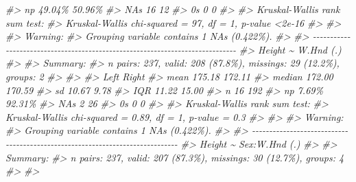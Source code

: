 \documentclass[
]{book}
\newenvironment{Shaded}{\begin{snugshade}}{\end{snugshade}}
\newcommand{\CommentTok}[1]{\textcolor[rgb]{0.56,0.35,0.01}{\textit{#1}}}
\begin{document}
\begin{Shaded}
\begin{Highlighting}[]
\CommentTok{\#\textgreater{} np      49.04\%  50.96\%}
\CommentTok{\#\textgreater{} NAs         16      12}
\CommentTok{\#\textgreater{} 0s           0       0}
\CommentTok{\#\textgreater{} }
\CommentTok{\#\textgreater{} Kruskal{-}Wallis rank sum test:}
\CommentTok{\#\textgreater{}   Kruskal{-}Wallis chi{-}squared = 97, df = 1, p{-}value \textless{}2e{-}16}
\CommentTok{\#\textgreater{} }
\CommentTok{\#\textgreater{} }
\CommentTok{\#\textgreater{} Warning:}
\CommentTok{\#\textgreater{}   Grouping variable contains 1 NAs (0.422\%).}
\CommentTok{\#\textgreater{} }
\CommentTok{\#\textgreater{} {-}{-}{-}{-}{-}{-}{-}{-}{-}{-}{-}{-}{-}{-}{-}{-}{-}{-}{-}{-}{-}{-}{-}{-}{-}{-}{-}{-}{-}{-}{-}{-}{-}{-}{-}{-}{-}{-}{-}{-}{-}{-}{-}{-}{-}{-}{-}{-}{-}{-}{-}{-}{-}{-}{-}{-}{-}{-}{-}{-}{-}{-}{-}{-}{-}{-}{-}{-}{-}{-}{-}{-}{-}{-}{-}{-}{-}{-} }
\CommentTok{\#\textgreater{} Height \textasciitilde{} W.Hnd (.)}
\CommentTok{\#\textgreater{} }
\CommentTok{\#\textgreater{} Summary: }
\CommentTok{\#\textgreater{} n pairs: 237, valid: 208 (87.8\%), missings: 29 (12.2\%), groups: 2}
\CommentTok{\#\textgreater{} }
\CommentTok{\#\textgreater{}                       }
\CommentTok{\#\textgreater{}           Left   Right}
\CommentTok{\#\textgreater{} mean    175.18  172.11}
\CommentTok{\#\textgreater{} median  172.00  170.59}
\CommentTok{\#\textgreater{} sd       10.67    9.78}
\CommentTok{\#\textgreater{} IQR      11.22   15.00}
\CommentTok{\#\textgreater{} n           16     192}
\CommentTok{\#\textgreater{} np       7.69\%  92.31\%}
\CommentTok{\#\textgreater{} NAs          2      26}
\CommentTok{\#\textgreater{} 0s           0       0}
\CommentTok{\#\textgreater{} }
\CommentTok{\#\textgreater{} Kruskal{-}Wallis rank sum test:}
\CommentTok{\#\textgreater{}   Kruskal{-}Wallis chi{-}squared = 0.89, df = 1, p{-}value = 0.3}
\CommentTok{\#\textgreater{} }
\CommentTok{\#\textgreater{} }
\CommentTok{\#\textgreater{} Warning:}
\CommentTok{\#\textgreater{}   Grouping variable contains 1 NAs (0.422\%).}
\CommentTok{\#\textgreater{} }
\CommentTok{\#\textgreater{} {-}{-}{-}{-}{-}{-}{-}{-}{-}{-}{-}{-}{-}{-}{-}{-}{-}{-}{-}{-}{-}{-}{-}{-}{-}{-}{-}{-}{-}{-}{-}{-}{-}{-}{-}{-}{-}{-}{-}{-}{-}{-}{-}{-}{-}{-}{-}{-}{-}{-}{-}{-}{-}{-}{-}{-}{-}{-}{-}{-}{-}{-}{-}{-}{-}{-}{-}{-}{-}{-}{-}{-}{-}{-}{-}{-}{-}{-} }
\CommentTok{\#\textgreater{} Height \textasciitilde{} Sex:W.Hnd (.)}
\CommentTok{\#\textgreater{} }
\CommentTok{\#\textgreater{} Summary: }
\CommentTok{\#\textgreater{} n pairs: 237, valid: 207 (87.3\%), missings: 30 (12.7\%), groups: 4}
\CommentTok{\#\textgreater{} }
\CommentTok{\#\textgreater{}                                                               }

\end{Highlighting}
\end{Shaded}
\end{document}
